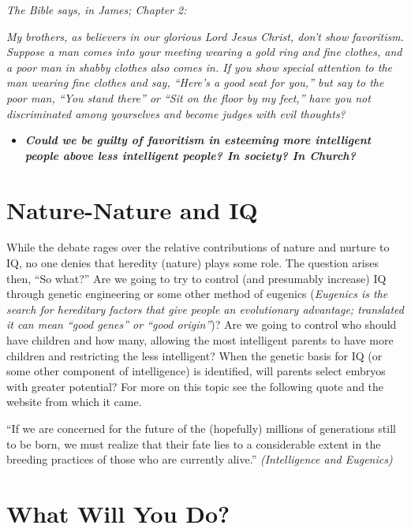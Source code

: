 \documentclass[
]{book}
\providecommand{\tightlist}{%
  \setlength{\itemsep}{0pt}\setlength{\parskip}{0pt}}
\begin{document}
\begin{reflect}
\emph{The Bible says, in James; Chapter 2:}

\emph{My brothers, as believers in our glorious Lord Jesus Christ, don't show favoritism. Suppose a man comes into your meeting wearing a gold ring and fine clothes, and a poor man in shabby clothes also comes in. If you show special attention to the man wearing fine clothes and say, ``Here's a good seat for you,'' but say to the poor man, ``You stand there'' or ``Sit on the floor by my feet,'' have you not discriminated among yourselves and become judges with evil thoughts?}

\begin{itemize}
\tightlist
\item
  \textbf{\emph{Could we be guilty of favoritism in esteeming more intelligent people above less intelligent people? In society? In Church?}}
\end{itemize}
\end{reflect}

\hypertarget{nature-nature-and-iq}{%
\section{Nature-Nature and IQ}\label{nature-nature-and-iq}}

While the debate rages over the relative contributions of nature and nurture to IQ, no one denies that heredity (nature) plays some role. The question arises then, ``So what?'' Are we going to try to control (and presumably increase) IQ through genetic engineering or some other method of eugenics (\emph{Eugenics is the search for hereditary factors that give people an evolutionary advantage; translated it can mean ``good genes'' or ``good origin''})? Are we going to control who should have children and how many, allowing the most intelligent parents to have more children and restricting the less intelligent? When the genetic basis for IQ (or some other component of intelligence) is identified, will parents select embryos with greater potential? For more on this topic see the following quote and the website from which it came.

``If we are concerned for the future of the (hopefully) millions of generations still to be born, we must realize that their fate lies to a considerable extent in the breeding practices of those who are currently alive.'' \emph{(Intelligence and Eugenics)}

\hypertarget{what-will-you-do}{%
\section{What Will You Do?}\label{what-will-you-do}}
\end{document}
